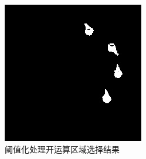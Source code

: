 \documentclass[a4paper]{ctexart}
\begin{document}
\begin{enumerate}[label=\arabic*、]
\begin{enumerate}[label=\alph*)]
\begin{figure}[htbp]
\begin{minipage}[t]{0.25\textwidth}
				\includegraphics[width=\textwidth]{figure/drop_1/img5.jpg}
			\end{minipage}
			\caption{阈值化处理开运算区域选择结果}\label{fig:阈值化开运算区域选择}
		\end{figure}
		

\end{enumerate}
\end{enumerate}
\end{document}
